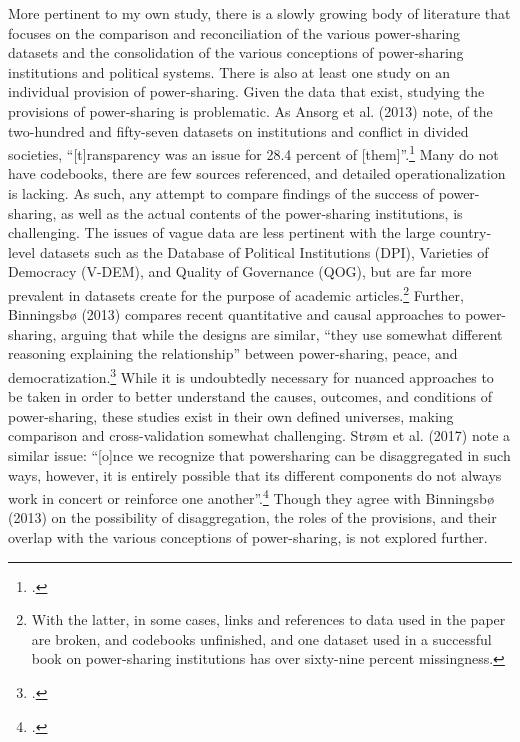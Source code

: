 \documentclass[12pt]{article}
\begin{document}
More pertinent to my own study, there is a slowly growing body of literature that focuses on the comparison and reconciliation of the various power-sharing datasets and the consolidation of the various conceptions of power-sharing institutions and political systems. There is also at least one study on an individual provision of power-sharing. Given the data that exist, studying the provisions of power-sharing is problematic. As Ansorg et al. (2013) note, of the two-hundred and fifty-seven datasets on institutions and conflict in divided societies, ``[t]ransparency was an issue for 28.4 percent of [them]''.\footcite[12]{ansorg_mind_2013} Many do not have codebooks, there are few sources referenced, and detailed operationalization is lacking. As such, any attempt to compare findings of the success of power-sharing, as well as the actual contents of the power-sharing institutions, is challenging. The issues of vague data are less pertinent with the large country-level datasets such as the Database of Political Institutions (DPI), Varieties of Democracy (V-DEM), and Quality of Governance (QOG), but are far more prevalent in datasets create for the purpose of academic articles.\footnote{With the latter, in some cases, links and references to data used in the paper are broken, and codebooks unfinished, and one dataset used in a successful book on power-sharing institutions has over sixty-nine percent missingness.} Further, Binningsbø (2013) compares recent quantitative and causal approaches to power-sharing, arguing that while the designs are similar, ``they use somewhat different reasoning explaining the relationship'' between power-sharing, peace, and democratization.\footcite[101]{binningsbo_power_2013} While it is undoubtedly necessary for nuanced approaches to be taken in order to better understand the causes, outcomes, and conditions of power-sharing, these studies exist in their own defined universes, making comparison and cross-validation somewhat challenging. Strøm et al. (2017) note a similar issue: ``[o]nce we recognize that powersharing can be disaggregated in such ways, however, it is entirely possible that its different components do not always work in concert or reinforce one another''.\footcite[6]{strom_inclusion_2017} Though they agree with Binningsbø (2013) on the possibility of disaggregation, the roles of the provisions, and their overlap with the various conceptions of power-sharing, is not explored further. 
\end{document}
